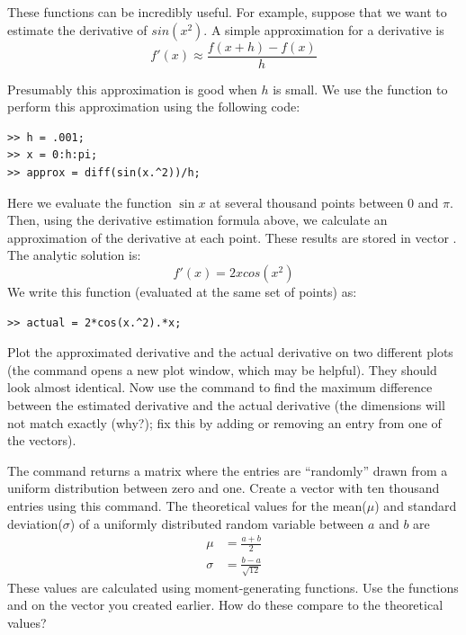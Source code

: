 These functions can be incredibly useful. For example, suppose that we want to estimate the derivative of $sin(x^2)$. A simple approximation for a derivative is
\[
f'(x) \approx \frac{f(x+h) - f(x)}{h}
\]

Presumably this approximation is good when $h$ is small. We use the  function to perform this approximation using the following code:

\begin{lstlisting}[style=matlab]
>> h = .001;
>> x = 0:h:pi;
>> approx = diff(sin(x.^2))/h;
\end{lstlisting}

Here we evaluate the function $\sin{x}$ at several thousand points between $0$ and $\pi$.  Then, using the derivative estimation formula above, we calculate an approximation of the derivative at each point.  These results are stored in vector .  The analytic solution is:
\[
f'(x) = 2x cos(x^2)
\]
We write this function (evaluated at the same set of points) as:
\begin{lstlisting}[style=matlab]
>> actual = 2*cos(x.^2).*x;
\end{lstlisting}

\begin{problem}
Plot the approximated derivative and the actual derivative on two different plots (the command  opens a new plot window, which may be helpful). They should look almost identical. Now use the  command to find the maximum difference between the estimated derivative and the actual derivative (the dimensions will not match exactly (why?);  fix this by adding or removing an entry from one of the vectors).
\end{problem}

\begin{problem}
The command  returns a matrix where the entries are ``randomly'' drawn from a uniform distribution between zero and one. Create a vector with ten thousand entries using this command. The theoretical values for the mean($\mu$) and standard deviation($\sigma$) of a uniformly distributed random variable between $a$ and $b$ are
\begin{align*}
\mu &= \frac{a+b}{2} \\
\sigma &= \frac{b-a}{\sqrt{12}}
\end{align*}
These values are calculated using moment-generating functions. Use the functions  and  on the vector you created earlier. How do these compare to the theoretical values?
\end{problem}

